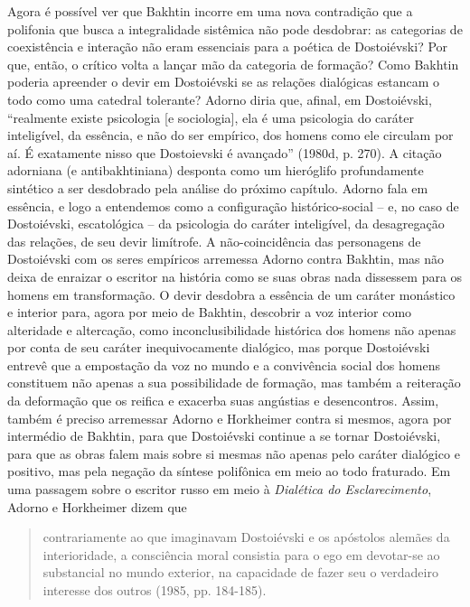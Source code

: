 Agora é possível ver que Bakhtin incorre em uma nova contradição que a
polifonia que busca a integralidade sistêmica não pode desdobrar: as
categorias de coexistência e interação não eram essenciais para a
poética de Dostoiévski? Por que, então, o crítico volta a lançar mão da
categoria de formação? Como Bakhtin poderia apreender o devir em
Dostoiévski se as relações dialógicas estancam o todo como uma catedral
tolerante? Adorno diria que, afinal, em Dostoiévski, ``realmente existe
psicologia {[}e sociologia{]}, ela é uma psicologia do caráter
inteligível, da essência, e não do ser empírico, dos homens como ele
circulam por aí. É exatamente nisso que Dostoievski é avançado'' (1980d,
p. 270). A citação adorniana (e antibakhtiniana) desponta como um
hieróglifo profundamente sintético a ser desdobrado pela análise do
próximo capítulo. Adorno fala em essência, e logo a entendemos como a
configuração histórico-social -- e, no caso de Dostoiévski, escatológica
-- da psicologia do caráter inteligível, da desagregação das relações,
de seu devir limítrofe. A não-coincidência das personagens de
Dostoiévski com os seres empíricos arremessa Adorno contra Bakhtin, mas
não deixa de enraizar o escritor na história como se suas obras nada
dissessem para os homens em transformação. O devir desdobra a essência
de um caráter monástico e interior para, agora por meio de Bakhtin,
descobrir a voz interior como alteridade e altercação, como
inconclusibilidade histórica dos homens não apenas por conta de seu
caráter inequivocamente dialógico, mas porque Dostoiévski entrevê que a
empostação da voz no mundo e a convivência social dos homens constituem
não apenas a sua possibilidade de formação, mas também a reiteração da
deformação que os reifica e exacerba suas angústias e desencontros.
Assim, também é preciso arremessar Adorno e Horkheimer contra si mesmos,
agora por intermédio de Bakhtin, para que Dostoiévski continue a se
tornar Dostoiévski, para que as obras falem mais sobre si mesmas não
apenas pelo caráter dialógico e positivo, mas pela negação da síntese
polifônica em meio ao todo fraturado. Em uma passagem sobre o escritor
russo em meio à \emph{Dialética do Esclarecimento}, Adorno e Horkheimer
dizem que

\begin{quote}
contrariamente ao que imaginavam Dostoiévski e os apóstolos alemães da
interioridade, a consciência moral consistia para o ego em devotar-se ao
substancial no mundo exterior, na capacidade de fazer seu o verdadeiro
interesse dos outros (1985, pp. 184-185).
\end{quote}


